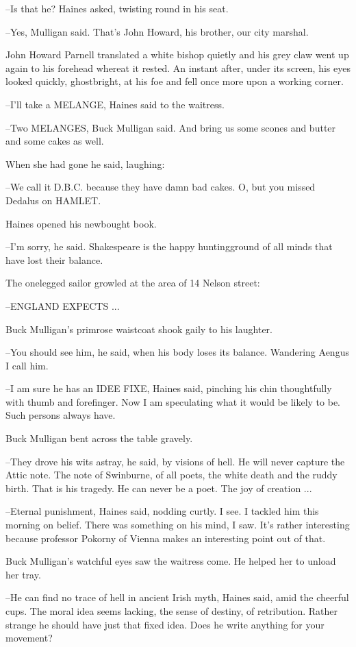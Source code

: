 --Is that he? Haines asked, twisting round in his seat.

--Yes, Mulligan said. That's John Howard, his brother, our city marshal.

John Howard Parnell translated a white bishop quietly and his grey
claw went up again to his forehead whereat it rested. An instant after,
under its screen, his eyes looked quickly, ghostbright, at his foe and
fell once more upon a working corner.

--I'll take a MELANGE, Haines said to the waitress.

--Two MELANGES, Buck Mulligan said. And bring us some scones and butter
and some cakes as well.

When she had gone he said, laughing:

--We call it D.B.C. because they have damn bad cakes. O, but you missed
Dedalus on HAMLET.

Haines opened his newbought book.

--I'm sorry, he said. Shakespeare is the happy huntingground of all minds
that have lost their balance.

The onelegged sailor growled at the area of 14 Nelson street:

--ENGLAND EXPECTS ...

Buck Mulligan's primrose waistcoat shook gaily to his laughter.

--You should see him, he said, when his body loses its balance. Wandering
Aengus I call him.

--I am sure he has an IDEE FIXE, Haines said, pinching his chin
thoughtfully with thumb and forefinger. Now I am speculating what it would
be likely to be. Such persons always have.

Buck Mulligan bent across the table gravely.

--They drove his wits astray, he said, by visions of hell. He will never
capture the Attic note. The note of Swinburne, of all poets, the white
death and the ruddy birth. That is his tragedy. He can never be a poet.
The joy of creation ...

--Eternal punishment, Haines said, nodding curtly. I see. I tackled him
this morning on belief. There was something on his mind, I saw. It's
rather interesting because professor Pokorny of Vienna makes an
interesting point out of that.

Buck Mulligan's watchful eyes saw the waitress come. He helped her
to unload her tray.

--He can find no trace of hell in ancient Irish myth, Haines said, amid
the cheerful cups. The moral idea seems lacking, the sense of destiny, of
retribution. Rather strange he should have just that fixed idea. Does he
write anything for your movement?

